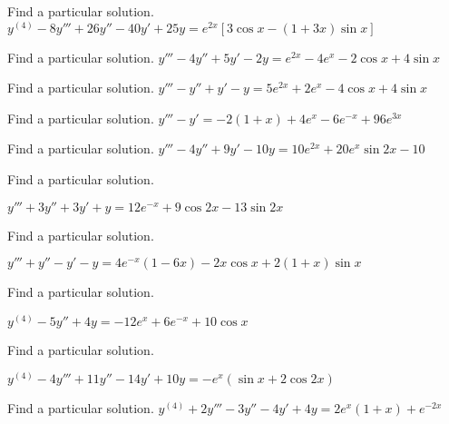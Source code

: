 \documentclass{ximera}
\begin{document}
\begin{problem}\label{exer:9.3.47}   Find a particular solution.   $y^{(4)}-8y'''+26y''-40y'+25y=e^{2x}[3\cos
x-(1+3x)\sin x]$
\end{problem}

\begin{problem}\label{exer:9.3.48}   Find a particular solution.   $y'''-4y''+5y'-2y=e^{2x}-4e^x-2\cos x+4\sin x$
\end{problem}

\begin{problem}\label{exer:9.3.49}   Find a particular solution.   $y'''-y''+y'-y=5e^{2x}+2e^x-4\cos x+4\sin x$
\end{problem}

\begin{problem}\label{exer:9.3.50}   Find a particular solution.   $y'''-y'=-2(1+x)+4e^x-6e^{-x}+96e^{3x}$
\end{problem}

\begin{problem}\label{exer:9.3.51}   Find a particular solution.   $y'''-4y''+9y'-10y=10e^{2x}+20e^x\sin2x-10$
\end{problem}

\begin{problem}\label{exer:9.3.52}   Find a particular solution.

$y'''+3y''+3y'+y=12e^{-x}+9\cos2x-13\sin2x$
\end{problem}

\begin{problem}\label{exer:9.3.53}   Find a particular solution.

$y'''+y''-y'-y=4e^{-x}(1-6x)-2x\cos x+2(1+x)\sin
x $
\end{problem}

\begin{problem}\label{exer:9.3.54}   Find a particular solution.

$y^{(4)}-5y''+4y=-12e^x+6e^{-x}+10\cos x$
\end{problem}

\begin{problem}\label{exer:9.3.55}   Find a particular solution.

$y^{(4)}-4y'''+11y''-14y'+10y=-e^x(\sin
x+2\cos2x)$
\end{problem}

\begin{problem}\label{exer:9.3.56}   Find a particular solution.   $y^{(4)}+2y'''-3y''-4y'+4y=2e^x(1+x)+e^{-2x}$
\end{problem}
\end{document}

